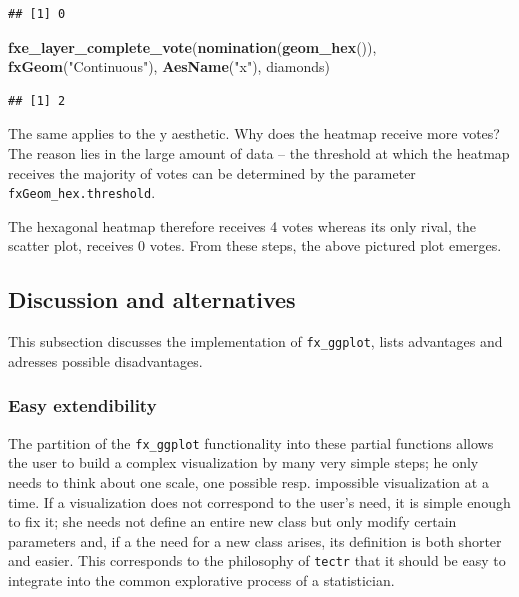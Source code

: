 \documentclass[]{report}
\newenvironment{Shaded}{\begin{snugshade}}{\end{snugshade}}
\newcommand{\KeywordTok}[1]{\textcolor[rgb]{0.13,0.29,0.53}{\textbf{#1}}}
\newcommand{\StringTok}[1]{\textcolor[rgb]{0.31,0.60,0.02}{#1}}
\newcommand{\NormalTok}[1]{#1}
\theoremstyle{definition}
\theoremstyle{definition}
\theoremstyle{definition}
\theoremstyle{remark}
\begin{document}
\begin{verbatim}
## [1] 0
\end{verbatim}

\begin{Shaded}
\begin{Highlighting}[]
\KeywordTok{fxe_layer_complete_vote}\NormalTok{(}\KeywordTok{nomination}\NormalTok{(}\KeywordTok{geom_hex}\NormalTok{()), }\KeywordTok{fxGeom}\NormalTok{(}\StringTok{"Continuous"}\NormalTok{), }\KeywordTok{AesName}\NormalTok{(}\StringTok{"x"}\NormalTok{), diamonds)}
\end{Highlighting}
\end{Shaded}

\begin{verbatim}
## [1] 2
\end{verbatim}

The same applies to the y aesthetic. Why does the heatmap receive more
votes? The reason lies in the large amount of data -- the threshold at
which the heatmap receives the majority of votes can be determined by
the parameter \texttt{fxGeom\_hex.threshold}.

The hexagonal heatmap therefore receives 4 votes whereas its only rival,
the scatter plot, receives 0 votes. From these steps, the above pictured
plot emerges.

\subsection{Discussion and
alternatives}\label{discussion-and-alternatives}

This subsection discusses the implementation of \texttt{fx\_ggplot},
lists advantages and adresses possible disadvantages.

\subsubsection{Easy extendibility}\label{easy-extendibility}

The partition of the \texttt{fx\_ggplot} functionality into these
partial functions allows the user to build a complex visualization by
many very simple steps; he only needs to think about one scale, one
possible resp. impossible visualization at a time. If a visualization
does not correspond to the user's need, it is simple enough to fix it;
she needs not define an entire new class but only modify certain
parameters and, if a the need for a new class arises, its definition is
both shorter and easier. This corresponds to the philosophy of
\texttt{tectr} that it should be easy to integrate into the common
explorative process of a statistician.
\end{document}
